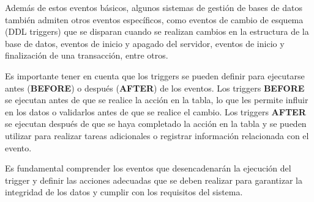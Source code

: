 \documentclass[executivepaper]{article}
\begin{document}
Además de estos eventos básicos, algunos sistemas de gestión de bases de datos también admiten otros eventos específicos, como eventos de cambio de esquema (DDL triggers) que se disparan cuando se realizan cambios en la estructura de la base de datos, eventos de inicio y apagado del servidor, eventos de inicio y finalización de una transacción, entre otros.

Es importante tener en cuenta que los triggers se pueden definir para ejecutarse antes (\textbf{BEFORE}) o después (\textbf{AFTER}) de los eventos. Los triggers \textbf{BEFORE} se ejecutan antes de que se realice la acción en la tabla, lo que les permite influir en los datos o validarlos antes de que se realice el cambio. Los triggers \textbf{AFTER} se ejecutan después de que se haya completado la acción en la tabla y se pueden utilizar para realizar tareas adicionales o registrar información relacionada con el evento.

Es fundamental comprender los eventos que desencadenarán la ejecución del trigger y definir las acciones adecuadas que se deben realizar para garantizar la integridad de los datos y cumplir con los requisitos del sistema.
\end{document}
